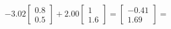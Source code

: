 \documentclass[preview]{standalone}
\begin{document}
\begin{align*}
-3.02 \begin{bmatrix} 0.8 \\ 0.5 \end{bmatrix} + 2.00 \begin{bmatrix} 1 \\ 1.6 \end{bmatrix} = \begin{bmatrix} -0.41 \\ 1.69 \end{bmatrix} =
\end{align*}
\end{document}
